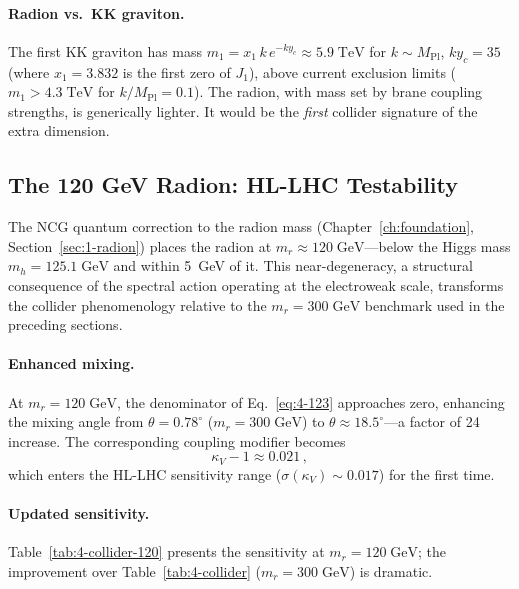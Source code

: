 \paragraph{Radion vs.\ KK graviton.} The first KK graviton has mass $m_1 = x_1\, k\, e^{-ky_c} \approx 5.9\;\mathrm{TeV}$ for $k \sim M_{\mathrm{Pl}}$, $ky_c = 35$ (where $x_1 = 3.832$ is the first zero of $J_1$), above current exclusion limits ($m_1 > 4.3\;\mathrm{TeV}$ for $k/M_{\mathrm{Pl}} = 0.1$).  The radion, with mass set by brane coupling strengths, is generically lighter.  It would be the \emph{first} collider signature of the extra dimension.

\subsection{The 120 GeV Radion: HL-LHC Testability}
\label{sec:4-radion-120}

The NCG quantum correction to the radion mass (Chapter~\ref{ch:foundation}, Section~\ref{sec:1-radion}) places the radion at $m_r \approx 120\;\mathrm{GeV}$---below the Higgs mass $m_h = 125.1\;\mathrm{GeV}$ and within 5~GeV of it.  This near-degeneracy, a structural consequence of the spectral action operating at the electroweak scale, transforms the collider phenomenology relative to the $m_r = 300\;\mathrm{GeV}$ benchmark used in the preceding sections.

\paragraph{Enhanced mixing.}  At $m_r = 120\;\mathrm{GeV}$, the denominator of Eq.~\eqref{eq:4-123} approaches zero, enhancing the mixing angle from $\theta = 0.78^\circ$ ($m_r = 300\;\mathrm{GeV}$) to $\theta \approx 18.5^\circ$---a factor of 24 increase.  The corresponding coupling modifier becomes
\begin{equation}
  \kappa_V - 1 \approx 0.021\,,
  \label{eq:4-kappa-120}
\end{equation}
which enters the HL-LHC sensitivity range ($\sigma(\kappa_V) \sim 0.017$) for the first time.

\paragraph{Updated sensitivity.}  Table~\ref{tab:4-collider-120} presents the sensitivity at $m_r = 120\;\mathrm{GeV}$; the improvement over Table~\ref{tab:4-collider} ($m_r = 300\;\mathrm{GeV}$) is dramatic.

